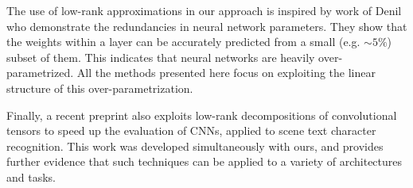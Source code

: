 The use of low-rank approximations in our approach is inspired by work
of Denil \etal \cite{denil2013predicting} who demonstrate the redundancies in neural
network parameters. They show that the weights within a layer can be
accurately predicted from a small (e.g. $\sim 5\%$) subset of them. This
indicates that neural networks are heavily over-parametrized.  All the
methods presented here focus on exploiting the linear structure of this
over-parametrization.

Finally, a recent preprint \cite{zisserman14} also exploits low-rank decompositions
of convolutional tensors to speed up the evaluation of CNNs, applied to scene text character
recognition. This work was developed simultaneously with ours, and provides 
further evidence that such techniques can be applied to a variety of architectures 
and tasks. 


